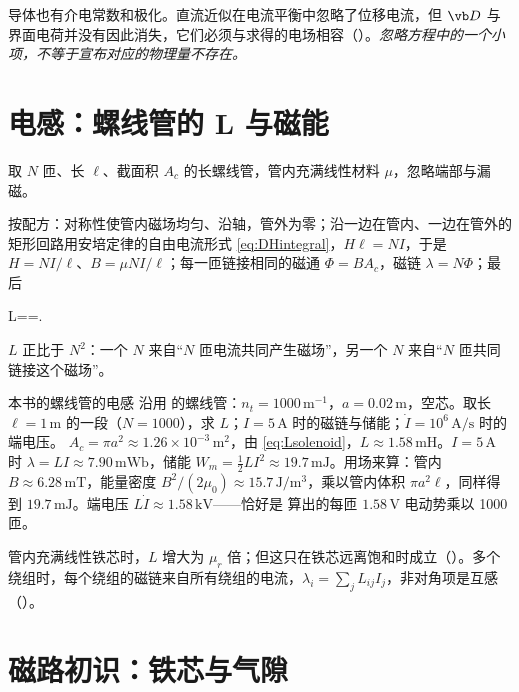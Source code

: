 导体也有介电常数和极化。直流近似在电流平衡中忽略了位移电流，但 $\vb D$ 与界面电荷并没有因此消失，它们必须与求得的电场相容（）。\emph{忽略方程中的一个小项，不等于宣布对应的物理量不存在。}

\section{电感：螺线管的 L 与磁能}\label{sec:systems-inductor}

取 $N$ 匝、长 $\ell$、截面积 $A_c$ 的长螺线管，管内充满线性材料 $\mu$，忽略端部与漏磁。

按配方：对称性使管内磁场均匀、沿轴，管外为零；沿一边在管内、一边在管外的矩形回路用安培定律的自由电流形式 \eqref{eq:DHintegral}，$H\ell=NI$，于是 $H=NI/\ell$、$B=\mu NI/\ell$；每一匝链接相同的磁通 $\Phi=BA_c$，磁链 $\lambda=N\Phi$；最后
\begin{keyeq}
L==.
\label{eq:Lsolenoid}
\end{keyeq}
$L$ 正比于 $N^2$：一个 $N$ 来自“$N$ 匝电流共同产生磁场”，另一个 $N$ 来自“$N$ 匝共同链接这个磁场”。

\begin{example}{本书的螺线管的电感}\label{ex:systems-inductor}
沿用 的螺线管：$n_t=1000\,\mathrm{m^{-1}}$，$a=0.02\,\mathrm m$，空芯。取长 $\ell=1\,\mathrm m$ 的一段（$N=1000$），求 $L$；$I=5\,\mathrm A$ 时的磁链与储能；$\dot I=10^6\,\mathrm{A/s}$ 时的端电压。
\solution
$A_c=\pi a^2\approx1.26\times10^{-3}\,\mathrm{m^2}$，由 \eqref{eq:Lsolenoid}，$L\approx1.58\,\mathrm{mH}$。$I=5\,\mathrm A$ 时 $\lambda=LI\approx7.90\,\mathrm{mWb}$，储能 $W_m=\tfrac12LI^2\approx19.7\,\mathrm{mJ}$。用场来算：管内 $B\approx6.28\,\mathrm{mT}$，能量密度 $B^2/(2\mu_0)\approx15.7\,\mathrm{J/m^3}$，乘以管内体积 $\pi a^2\ell$，同样得到 $19.7\,\mathrm{mJ}$。端电压 $L\dot I\approx1.58\,\mathrm{kV}$——恰好是 算出的每匝 $1.58\,\mathrm V$ 电动势乘以 1000 匝。
\end{example}

管内充满线性铁芯时，$L$ 增大为 $\mu_r$ 倍；但这只在铁芯远离饱和时成立（）。多个绕组时，每个绕组的磁链来自所有绕组的电流，$\lambda_i=\sum_jL_{ij}I_j$，非对角项是互感（）。

\section{磁路初识：铁芯与气隙}\label{sec:systems-magcircuit}

